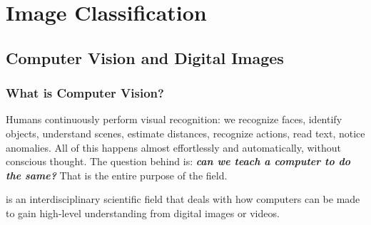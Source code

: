 \section{Image Classification}\label{sec:image-classification}

\subsection{Computer Vision and Digital Images}\label{sec:computer-vision-and-digital-images}

\subsubsection{What is Computer Vision?}\label{sec:what-is-computer-vision}

Humans continuously perform visual recognition: we recognize faces, identify objects, understand scenes, estimate distances, recognize actions, read text, notice anomalies. All of this happens almost effortlessly and automatically, without conscious thought. The question behind  is: \emph{\textbf{can we teach a computer to do the same?}} That is the entire purpose of the field.

\highspace
\begin{definitionbox}
     is an interdisciplinary scientific field that deals with how computers can be made to gain high-level understanding from digital images or videos.
\end{definitionbox}

